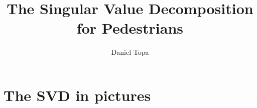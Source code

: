 \documentclass[theoremb]{gsm-l}
\begin{document}
\frontmatter

\title{The Singular Value Decomposition\\for Pedestrians}

\author{Daniel Topa}
\address{University of New Mexico\\Albuquerque, New Mexico}

\maketitle

\setcounter{page}{7}

\tableofcontents

\mainmatter

\part{The SVD in pictures}


%


\end{document}
